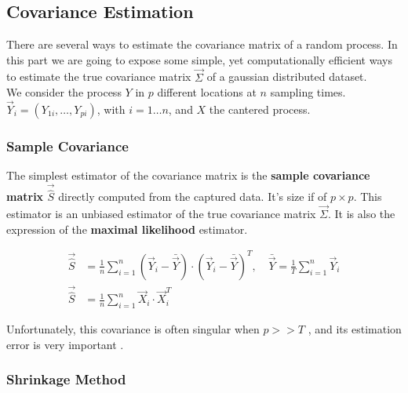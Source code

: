 \subsection{Covariance Estimation}


There are several ways to estimate the covariance matrix of a random process. In this part we are going to expose some simple, yet computationally efficient ways to estimate the true covariance matrix $\vec{\Sigma}$ of a gaussian distributed dataset.\\

We consider the process $Y$ in $p$ different locations at $n$ sampling times. $\vec{Y}_i = (Y_{1i}, \dots, Y_{pi})$, with $i = 1 \dots n$, and $X$ the cantered process. \\

\subsubsection{Sample Covariance}

The simplest estimator of the covariance matrix is the \textbf{sample covariance matrix} $ \vec{\hat{S}} $ directly computed from the captured data. It's size if of $p\times p$. This estimator is an unbiased estimator of the true covariance matrix $\vec{\Sigma}$. It is also the expression of the \textbf{maximal likelihood} estimator. 

\begin{align}
    \vec{\hat{S}} &= \frac{1}{n} \sum_{i=1}^n (\vec{Y}_i - \bar{\vec{Y}})\cdot (\vec{Y}_i - \bar{\vec{Y}})^T, \quad \bar{\vec{Y}} = \frac{1}{T} \sum_{i=1}^n \vec{Y}_i \\
    \vec{\hat{S}} &= \frac{1}{n} \sum_{i=1}^n \vec{X}_i \cdot \vec{X}_i^T 
\end{align}

Unfortunately, this covariance is often singular when $p >> T$ \citep{fan_overview_2015}, and its estimation error is very important \citep{ledoit_honey_2003}.

\subsubsection{Shrinkage Method}


%
%
%
%
%
%

